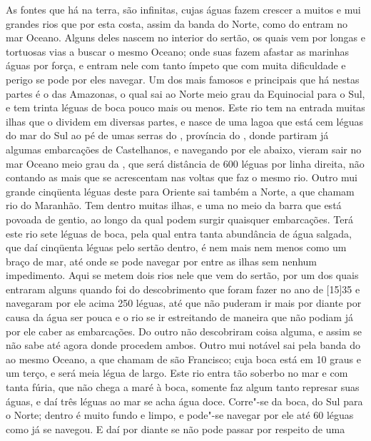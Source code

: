 As fontes que há na terra, são infinitas, cujas águas fazem crescer a
muitos e mui grandes rios que por esta costa, assim da banda do Norte,
como do  entram no mar Oceano. Alguns deles nascem no interior		
do sertão, os quais vem por longas e tortuosas vias a buscar o mesmo
Oceano; onde suas  fazem afastar as marinhas águas por força,
e entram nele com tanto ímpeto que com muita dificuldade e perigo se
pode por eles navegar. Um dos mais famosos e principais que há nestas
partes é o das Amazonas, o qual sai ao Norte meio grau da Equinocial			%
para o Sul, e tem trinta léguas de boca pouco mais ou menos. Este rio
tem na entrada muitas ilhas que o dividem em diversas partes, e nasce
de uma lagoa que está cem léguas do mar do Sul ao pé de umas serras do
, província do , donde partiram já algumas embarcações de
Castelhanos, e navegando por ele abaixo, vieram sair no mar Oceano
meio grau da , que  será distância de 600 léguas por linha
direita, não contando as mais que se acrescentam nas voltas que faz o
mesmo rio. Outro mui grande cinqüenta léguas deste para Oriente sai
também a Norte, a que chamam rio do Maranhão. Tem dentro muitas ilhas,			%
e uma no meio da barra que está  povoada de gentio, ao longo da qual			%
podem surgir quaisquer embarcações. Terá este rio sete léguas de boca,
pela qual entra tanta abundância de água salgada, que daí cinqüenta
léguas pelo sertão dentro, é nem mais nem menos como um braço de mar,
até onde se pode navegar por entre as ilhas sem nenhum impedimento.
Aqui se metem dois rios nele que vem do sertão, por um dos quais entraram alguns  quando foi do
descobrimento que foram fazer no ano de [15]35 e navegaram por ele acima
250 léguas, até que não puderam ir mais por diante por
causa da água ser pouca e o rio se ir estreitando de maneira que não
podiam já por ele caber as embarcações. Do outro não descobriram coisa
alguma, e assim se não sabe até agora donde procedem ambos. Outro mui
notável sai pela banda do  ao mesmo Oceano, a que chamam de são		%
Francisco; cuja boca está em 10 graus e um terço, e será meia légua de
largo. Este rio entra tão soberbo no mar e com tanta fúria, que não
chega a maré à boca, somente faz algum tanto represar suas águas, e daí três léguas ao mar se acha água
doce. Corre"-se da boca, do Sul para o Norte; dentro é muito fundo e
limpo, e pode"-se navegar por ele até 60 léguas como já se
navegou. E daí por diante se não pode passar por respeito de uma
